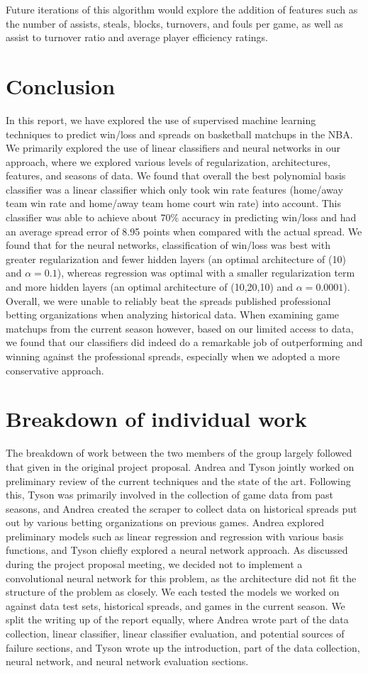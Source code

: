 \documentclass{article}
\begin{document}
Future iterations of this algorithm would explore the addition of features such as the number of assists, steals, blocks, turnovers, and fouls per game, as well as assist to turnover ratio and average player efficiency ratings.

\section{Conclusion}
In this report, we have explored the use of supervised machine learning techniques to predict win/loss and spreads on basketball matchups in the NBA. We primarily explored the use of linear classifiers and neural networks in our approach, where we explored various levels of regularization, architectures, features, and seasons of data. We found that overall the best polynomial basis classifier was a linear classifier which only took win rate features (home/away team win rate and home/away team home court win rate) into account. This classifier was able to achieve about 70\% accuracy in predicting win/loss and had an average spread error of 8.95 points when compared with the actual spread. We found that for the neural networks, classification of win/loss was best with greater regularization and fewer hidden layers (an optimal architecture of (10) and $\alpha = 0.1$), whereas regression was optimal with a smaller regularization term and more hidden layers (an optimal architecture of (10,20,10) and $\alpha = 0.0001$). Overall, we were unable to reliably beat the spreads published professional betting organizations when analyzing historical data. When examining game matchups from the current season however, based on our limited access to data, we found that our classifiers did indeed do a remarkable job of outperforming and winning against the professional spreads, especially when we adopted a more conservative approach.

\section{Breakdown of individual work}
The breakdown of work between the two members of the group largely followed that given in the original project proposal. Andrea and Tyson jointly worked on preliminary review of the current techniques and the state of the art. Following this, Tyson was primarily involved in the collection of game data from past seasons, and Andrea created the scraper to collect data on historical spreads put out by various betting organizations on previous games. Andrea explored preliminary models such as linear regression and regression with various basis functions, and Tyson chiefly explored a neural network approach. As discussed during the project proposal meeting, we decided not to implement a convolutional neural network for this problem, as the architecture did not fit the structure of the problem as closely. We each tested the models we worked on against data test sets, historical spreads, and games in the current season. We split the writing up of the report equally, where Andrea wrote part of the data collection, linear classifier, linear classifier evaluation, and potential sources of failure sections, and Tyson wrote up the introduction, part of the data collection, neural network, and neural network evaluation sections.
\end{document}

